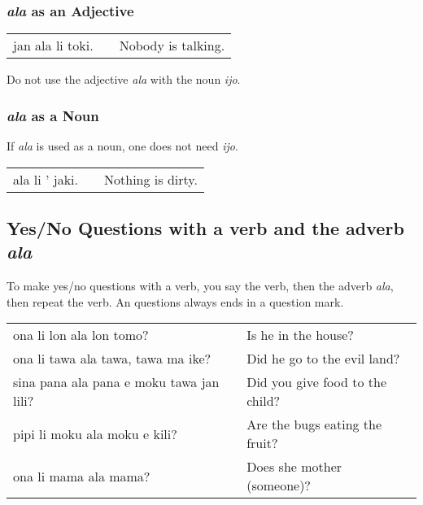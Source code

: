 %
\subsubsection*{\textit{ala} as an Adjective}
%

\begin{supertabular}{p{5,5cm}|ll}
jan ala li toki. && Nobody is talking. \\
\end{supertabular} 

Do not use the adjective \textit{ala} with the noun \textit{ijo}. 

%
\subsubsection*{\textit{ala} as a Noun}
%

If \textit{ala} is used as a noun, one does not need \textit{ijo}.

\begin{supertabular}{p{5,5cm}|ll}
ala li ' jaki. && Nothing is dirty. \\
\end{supertabular} 

%
{}
\subsection*{Yes/No Questions with a verb and the adverb \textit{ala}}

To make yes/no questions with a verb, you say the verb, then the adverb \textit{ala}, then repeat the verb. 
An questions always ends in a question mark.

\begin{supertabular}{p{5,5cm}|ll}
ona li lon ala lon tomo? && Is he in the house? \\
ona li tawa ala tawa, tawa ma ike? && Did he go to the evil land? \\
sina pana ala pana e moku tawa jan lili? && Did you give food to the child? \\
pipi li moku ala moku e kili? && Are the bugs eating the fruit? \\
ona li mama ala mama? && Does she mother (someone)? \\
\end{supertabular} 


